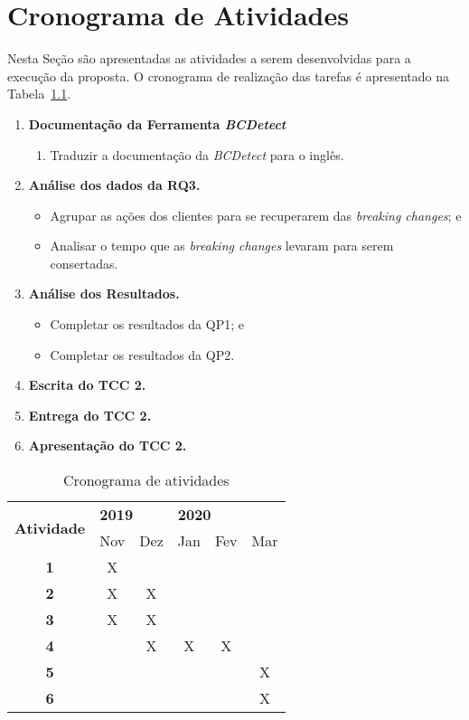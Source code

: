 \chapter{Cronograma de Atividades}
\label{cap:cronograma}

Nesta Seção são apresentadas as atividades a serem desenvolvidas para a execução da proposta. O cronograma de realização das tarefas é apresentado na Tabela~\ref{tab:cronograma}.

\begin{enumerate}
\item \textbf{Documentação da Ferramenta \textit{BCDetect}}
    \begin{enumerate}
        \item Traduzir a documentação da \textit{BCDetect} para o inglês.
    \end{enumerate}{}
\item \textbf{Análise dos dados da RQ3.}
    \begin{itemize}
        \item Agrupar as ações dos clientes para se recuperarem das \textit{breaking changes}; e
        \item Analisar o tempo que as \textit{breaking changes} levaram para serem consertadas.
    \end{itemize}{}
\item \textbf{Análise dos Resultados.}
    \begin{itemize}
        \item Completar os resultados da QP1; e
        \item Completar os resultados da QP2.
    \end{itemize}{}
\item \textbf{Escrita do TCC 2.}
\item \textbf{Entrega do TCC 2.}
\item \textbf{Apresentação do TCC 2.}
\end{enumerate}

\begin{table}[h!]
\centering
\renewcommand{\arraystretch}{1.3}
\begin{tabular}{|c|c|c|c|c|c|}
\hline
\multirow{2}{*}{\textbf{Atividade}} & \multicolumn{2}{l|}{\textbf{2019}} & \multicolumn{3}{l|}{\textbf{2020}} \\ \cline{2-6} 
             & Nov & Dez & Jan & Fev & Mar \\ \hline
\textbf{1}   &  X  &     &     &     &     \\ \hline
\textbf{2}   &  X  &  X  &     &     &     \\ \hline
\textbf{3}   &  X  &  X  &     &     &     \\ \hline
\textbf{4}   &     &  X  &  X  &  X  &     \\ \hline
\textbf{5}   &     &     &     &     &  X  \\ \hline
\textbf{6}   &     &     &     &     &  X  \\ \hline
\end{tabular}
\caption{Cronograma de atividades}
\label{tab:cronograma}
\end{table}